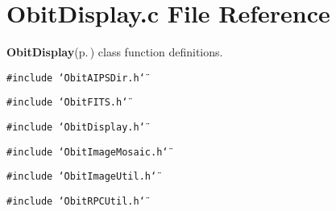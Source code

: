\section{Obit\-Display.c File Reference}
\label{ObitDisplay_8c}
{\bf Obit\-Display}{\rm (p.\,\pageref{structObitDisplay})} class function definitions. 

{\tt \#include \char`\"{}Obit\-AIPSDir.h\char`\"{}}\par
{\tt \#include \char`\"{}Obit\-FITS.h\char`\"{}}\par
{\tt \#include \char`\"{}Obit\-Display.h\char`\"{}}\par
{\tt \#include \char`\"{}Obit\-Image\-Mosaic.h\char`\"{}}\par
{\tt \#include \char`\"{}Obit\-Image\-Util.h\char`\"{}}\par
{\tt \#include \char`\"{}Obit\-RPCUtil.h\char`\"{}}\par
